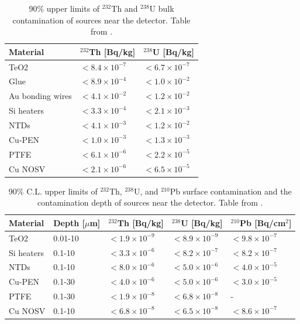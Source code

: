 \begin{table}[htbp]
\centering
\caption[90\% C.L. upper limits of $^{232}$Th and $^{238}$U bulk contamination of sources near the detector.]
{90\% upper limits of $^{232}$Th and $^{238}$U bulk contamination of sources near the detector.
Table from \cite{Alduino:2017qet}.}
\label{tab:NearDetectorSources_Bulk}
\begin{tabular}{lll}
\hline
\hline
Material         & $^{232}$Th [Bq/kg]         & $^{238}$U [Bq/kg]    \\
\hline
TeO2             & $<8.4\times10^{-7}$ & $<6.7\times10^{-7}$      \\
Glue             & $<8.9\times10^{-4}$ & $<1.0\times10^{-2}$          \\
Au bonding wires & $<4.1\times10^{-2}$ & $<1.2\times10^{-2}$       \\
Si heaters       & $<3.3\times10^{-4}$ & $<2.1\times10^{-3}$        \\
NTDs             & $<4.1\times10^{-3}$ & $<1.2\times10^{-2}$    \\
Cu-PEN           & $<1.0\times10^{-3}$ & $<1.3\times10^{-3}$ \\
PTFE             & $<6.1\times10^{-6}$ & $<2.2\times10^{-5}$       \\
Cu NOSV           & $<2.1\times10^{-6}$ & $<6.5\times10^{-5}$    \\
\hline
\hline
\end{tabular}
\end{table}

\begin{table}[htbp]
\centering
\caption[90\% C.L. upper limits of $^{232}$Th, $^{238}$U, and $^{210}$Pb surface contamination and the contamination depth of sources near the detector.]
{90\% C.L. upper limits of $^{232}$Th, $^{238}$U, and $^{210}$Pb surface contamination and the contamination depth of sources near the detector.
Table from \cite{Alduino:2017qet}.}
\label{tab:NearDetectorSources_Surface}
\begin{tabular}{lllll}
\hline
\hline
Material         & Depth [$\mu$m] & $^{232}$Th [Bq/kg]         & $^{238}$U [Bq/kg]     & $^{210}$Pb [Bq/cm$^2$] \\
\hline
TeO2  & 0.01-10 & $<1.9\times10^{-9}$ & $<8.9\times10^{-9}$ & $<9.8\times10^{-7}$ \\
Si heaters  & 0.1-10 & $<3.3\times10^{-6}$ & $<8.2\times10^{-7}$ & $<8.2\times10^{-7}$ \\
NTDs  & 0.1-10 & $<8.0\times10^{-6}$ & $<5.0\times10^{-6}$ & $<4.0\times10^{-5}$ \\
Cu-PEN  & 0.1-30 & $<4.0\times10^{-6}$ & $<5.0\times10^{-6}$ & $<3.0\times10^{-5}$ \\
PTFE  & 0.1-30 & $<1.9\times10^{-8}$ & $<6.8\times10^{-8}$ & - \\
Cu NOSV & 0.1-10 & $<6.8\times10^{-8}$ & $<6.5\times10^{-8}$ & $<8.6\times10^{-7}$ \\
\hline
\hline
\end{tabular}
\end{table}

